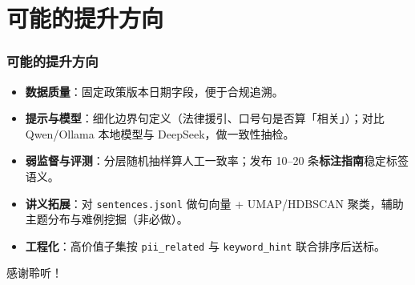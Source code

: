 \documentclass[AutoFakeBold,AutoFakeSlant]{beamer}
\begin{document}
\section{可能的提升方向}

\begin{frame}
    \frametitle{可能的提升方向}
    \begin{itemize}
        \item \textbf{数据质量}：固定政策版本日期字段，便于合规追溯。
        \item \textbf{提示与模型}：细化边界句定义（法律援引、口号句是否算「相关」）；对比 Qwen/Ollama 本地模型与 DeepSeek，做一致性抽检。
        \item \textbf{弱监督与评测}：分层随机抽样算人工一致率；发布 10--20 条\textbf{标注指南}稳定标签语义。
        \item \textbf{讲义拓展}：对 \texttt{sentences.jsonl} 做句向量 + UMAP/HDBSCAN 聚类，辅助主题分布与难例挖掘（非必做）。
        \item \textbf{工程化}：高价值子集按 \texttt{pii\_related} 与 \texttt{keyword\_hint} 联合排序后送标。
    \end{itemize}
\end{frame}

\begin{frame}
    \begin{center}
        {\Huge 感谢聆听！}
    \end{center}
\end{frame}
\end{document}
